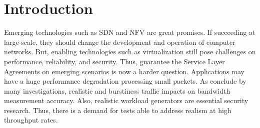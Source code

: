 \section{Introduction}
\label{sec:introduction}



Emerging technologies such as SDN and NFV are great promises. If succeeding at large-scale, they should change the development and operation of computer networks. But, enabling technologies such as virtualization still pose challenges on performance,  reliability, and security\cite{nfv-challenges}.  Thus, guarantee  the Service Layer Agreements on emerging scenarios is now a harder question. Applications may have a huge performance degradation processing small packets\cite{comparative-trafficgen-tools}. As conclude by many investigations, realistic and burstiness traffic impacts on bandwidth measurement accuracy\cite{legotg-paper}. Also, realistic workload generators are essential security research\cite{ditg-paper}. Thus, there is a demand for tests able to address realism at high throughput rates.  

